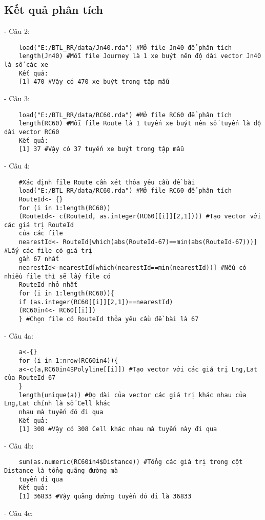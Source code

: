 \documentclass[a4paper]{article}
\begin{document}
	\subsection{Kết quả phân tích}
	- Câu 2: \\
	\begin{verbatim}
	load("E:/BTL_RR/data/Jn40.rda") #Mở file Jn40 để phân tích
	length(Jn40) #Mỗi file Journey là 1 xe buýt nên độ dài vector Jn40 là số các xe
	Kết quả:
	[1] 470 #Vậy có 470 xe buýt trong tập mẫu
	\end{verbatim}
	- Câu 3: \\
	\begin{verbatim}
	load("E:/BTL_RR/data/RC60.rda") #Mở file RC60 để phân tích
	length(RC60) #Mỗi file Route là 1 tuyến xe buýt nên số tuyến là độ dài vector RC60
	Kết quả:
	[1] 37 #Vậy có 37 tuyến xe buýt trong tập mẫu
	\end{verbatim}
	- Câu 4: \\
	\begin{verbatim}
	#Xác định file Route cần xét thỏa yêu cầu đề bài
	load("E:/BTL_RR/data/RC60.rda") #Mở file RC60 để phân tích
	RouteId<- {}
	for (i in 1:length(RC60))
	(RouteId<- c(RouteId, as.integer(RC60[[i]][2,1]))) #Tạo vector với các giá trị RouteId
	của các file
	nearestId<- RouteId[which(abs(RouteId-67)==min(abs(RouteId-67)))] #Lấy các file có giá trị
	gần 67 nhất
	nearestId<-nearestId[which(nearestId==min(nearestId))] #Nếu có nhiều file thì sẽ lấy file có 
	RouteId nhỏ nhất
	for (i in 1:length(RC60)){
	if (as.integer(RC60[[i]][2,1])==nearestId)
	(RC60in4<- RC60[[i]])
	} #Chọn file có RouteId thỏa yêu cầu đề bài là 67
	\end{verbatim}
	- Câu 4a: \\
	\begin{verbatim}
	a<-{}
	for (i in 1:nrow(RC60in4)){
	a<-c(a,RC60in4$Polyline[[i]]) #Tạo vector với các giá trị Lng,Lat của RouteId 67
	}
	length(unique(a)) #Đọ dài của vector các giá trị khác nhau của Lng,Lat chính là số Cell khác 
	nhau mà tuyến đó đi qua
	Kết quả:
	[1] 308 #Vậy có 308 Cell khác nhau mà tuyến này đi qua
	\end{verbatim}
	- Câu 4b: \\
	\begin{verbatim}
	sum(as.numeric(RC60in4$Distance)) #Tổng các giá trị trong cột Distance là tổng quãng đường mà 
	tuyến đi qua
	Kết quả:
	[1] 36833 #Vậy quãng đường tuyến đó đi là 36833
	\end{verbatim}
	- Câu 4c: \\
\end{document}
